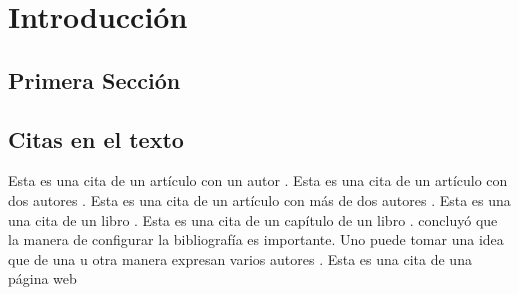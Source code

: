 \chapter{Introducción}
\lipsum[1-1]

\section{Primera Sección}
\lipsum[2]

\section{Citas en el texto}

Esta es una cita de un artículo con un autor \citep{henderson1999}.
Esta es una cita de un artículo con dos autores \citep{alvarado2005}.
Esta es una cita de un artículo con más de dos autores \citep{schwarz2017}. 
Esta es una una cita de un libro \citep{henderson2002}.
Esta es una cita de un capítulo de un libro \citep{coppard2013}.
\citet{henderson1999} concluyó que la manera de configurar la bibliografía es importante.
Uno puede tomar una idea que de una u otra manera expresan varios autores \citep{henderson1999,schwarz2017,coppard2013}.
Esta es una cita de una página web \citep{govaerts2015}